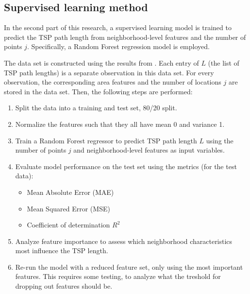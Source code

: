 \subsection{Supervised learning method}
In the second part of this research, a supervised learning model is trained to predict the TSP path length from neighborhood-level features and the number of
points \( j \). Specifically, a Random Forest regression model is employed.

The data set is constructed using the results from . Each entry of $L$ (the list of TSP path lengths) is a separate observation
in this data set. For every observation, the corresponding area features and the number of locations $j$ are stored in the data set. Then, the following steps
are performed:
\begin{enumerate}
	\item Split the data into a training and test set, 80/20 split.
	\item Normalize the features such that they all have mean 0 and variance 1.
	\item Train a Random Forest regressor to predict TSP path length \( L \) using the number of points \( j \) and neighborhood-level features as input variables.
	\item Evaluate model performance on the test set using the metrics (for the test data):
	      \begin{itemize}
		      \item Mean Absolute Error (MAE)
		      \item Mean Squared Error (MSE)
		      \item Coefficient of determination \( R^2 \)
	      \end{itemize}
	\item Analyze feature importance to assess which neighborhood characteristics most influence the TSP length.
	\item Re-run the model with a reduced feature set, only using the most important features.
	      This requires some testing, to analyze what the treshold for dropping out features should be.
\end{enumerate}

